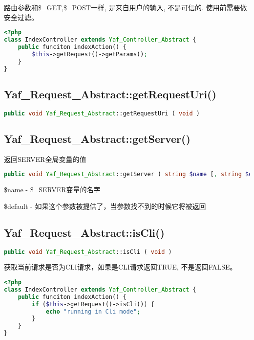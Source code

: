 路由参数和\$\_GET,\$\_POST一样, 是来自用户的输入, 不是可信的. 使用前需要做安全过滤。



\begin{lstlisting}[language=PHP]
<?php
class IndexController extends Yaf_Controller_Abstract {
    public funciton indexAction() {
        $this->getRequest()->getParams();
    }
}
\end{lstlisting}




\subsection{Yaf\_Request\_Abstract::getRequestUri()}




\begin{lstlisting}[language=PHP]
public void Yaf_Request_Abstract::getRequestUri ( void )
\end{lstlisting}



\subsection{Yaf\_Request\_Abstract::getServer()}

返回SERVER全局变量的值

\begin{lstlisting}[language=PHP]
public void Yaf_Request_Abstract::getServer ( string $name [, string $default ] )
\end{lstlisting}

\begin{compactitem}
\item \$name - \$\_SERVER变量的名字
\item \$default - 如果这个参数被提供了，当参数找不到的时候它将被返回
\end{compactitem}

\subsection{Yaf\_Request\_Abstract::isCli()}

\begin{lstlisting}[language=PHP]
public void Yaf_Request_Abstract::isCli ( void )
\end{lstlisting}

获取当前请求是否为CLI请求，如果是CLI请求返回TRUE, 不是返回FALSE。


\begin{lstlisting}[language=PHP]
<?php
class IndexController extends Yaf_Controller_Abstract {
    public funciton indexAction() {
        if ($this->getRequest()->isCli()) {
            echo "running in Cli mode";
        }
    }
}
\end{lstlisting}


